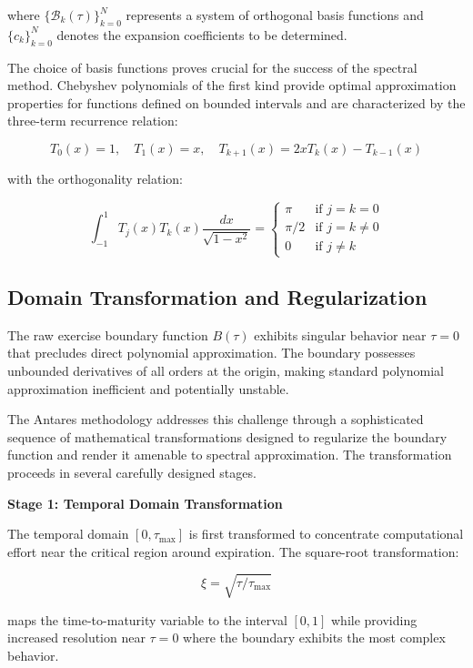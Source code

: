 \documentclass[
  american,
  11pt,
  11pt,
  letterpaper,
  onecolumn]{article}
\begin{document}
where \(\{\mathcal{B}_k(\tau)\}_{k=0}^{N}\) represents a system of
orthogonal basis functions and \(\{c_k\}_{k=0}^{N}\) denotes the
expansion coefficients to be determined.

The choice of basis functions proves crucial for the success of the
spectral method. Chebyshev polynomials of the first kind provide optimal
approximation properties for functions defined on bounded intervals and
are characterized by the three-term recurrence relation:

\[T_0(x) = 1, \quad T_1(x) = x, \quad T_{k+1}(x) = 2xT_k(x) - T_{k-1}(x) \tag{5.2}\]

with the orthogonality relation:

\[\int_{-1}^{1} T_j(x) T_k(x) \frac{dx}{\sqrt{1-x^2}} = \begin{cases}
\pi & \text{if } j = k = 0 \\
\pi/2 & \text{if } j = k \neq 0 \\
0 & \text{if } j \neq k
\end{cases} \tag{5.3}\]

\subsection{Domain Transformation and
Regularization}\label{domain-transformation-and-regularization}

The raw exercise boundary function \(B(\tau)\) exhibits singular
behavior near \(\tau = 0\) that precludes direct polynomial
approximation. The boundary possesses unbounded derivatives of all
orders at the origin, making standard polynomial approximation
inefficient and potentially unstable.

The Antares methodology addresses this challenge through a sophisticated
sequence of mathematical transformations designed to regularize the
boundary function and render it amenable to spectral approximation. The
transformation proceeds in several carefully designed stages.

\textbf{Stage 1: Temporal Domain Transformation}

The temporal domain \([0, \tau_{\max}]\) is first transformed to
concentrate computational effort near the critical region around
expiration. The square-root transformation:

\[\xi = \sqrt{\tau/\tau_{\max}} \tag{5.4}\]

maps the time-to-maturity variable to the interval \([0,1]\) while
providing increased resolution near \(\tau = 0\) where the boundary
exhibits the most complex behavior.
\end{document}
